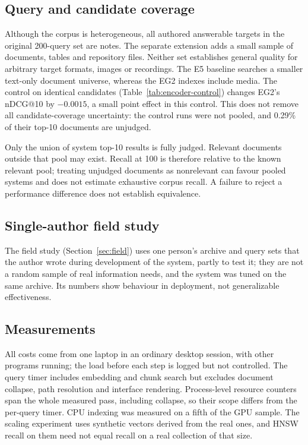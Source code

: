 \subsection{Query and candidate coverage}
Although the corpus is heterogeneous, all authored answerable targets in the original 200-query set are notes. The separate extension adds a small sample of documents, tables and repository files. Neither set establishes general quality for arbitrary target formats, images or recordings. The E5 baseline searches a smaller text-only document universe, whereas the EG2 indexes include media. The control on identical candidates (Table~\ref{tab:encoder-control}) changes EG2's nDCG@10 by $-0.0015$, a small point effect in this control. This does not remove all candidate-coverage uncertainty: the control runs were not pooled, and 0.29\% of their top-10 documents are unjudged.

Only the union of system top-10 results is fully judged. Relevant documents outside that pool may exist. Recall at 100 is therefore relative to the known relevant pool; treating unjudged documents as nonrelevant can favour pooled systems and does not estimate exhaustive corpus recall. A failure to reject a performance difference does not establish equivalence.

\subsection{Single-author field study}
The field study (Section~\ref{sec:field}) uses one person's archive and query sets that the author wrote during development of the system, partly to test it; they are not a random sample of real information needs, and the system was tuned on the same archive. Its numbers show behaviour in deployment, not generalizable effectiveness.

\subsection{Measurements}
All costs come from one laptop in an ordinary desktop session, with other programs running; the load before each step is logged but not controlled. The query timer includes embedding and chunk search but excludes document collapse, path resolution and interface rendering. Process-level resource counters span the whole measured pass, including collapse, so their scope differs from the per-query timer. CPU indexing was measured on a fifth of the GPU sample. The scaling experiment uses synthetic vectors derived from the real ones, and HNSW recall on them need not equal recall on a real collection of that size.

